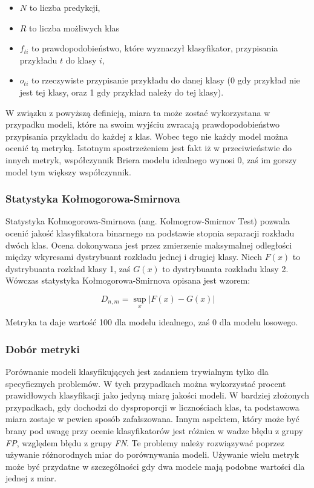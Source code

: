 \documentclass[a4paper, twoside, 11pt, openright]{article}
\begin{document}
\begin{itemize}
\item $N$ to liczba predykcji,
\item $R$  to liczba możliwych klas
\item $f_{ti}$ to prawdopodobieństwo, które wyznaczył klasyfikator, przypisania przykładu $t$ do klasy $i$,
\item $o_{ti}$ to rzeczywiste przypisanie przykładu do danej klasy (0 gdy przykład nie jest tej klasy, oraz 1 gdy przykład należy do tej klasy).
\end{itemize}

W związku z powyższą definicją, miara ta może zostać wykorzystana w przypadku modeli, które na swoim wyjściu zwracają prawdopodobieństwo przypisania przykładu do każdej z klas. Wobec tego nie każdy model można ocenić tą metryką. Istotnym spostrzeżeniem jest fakt iż w przeciwieństwie do innych metryk, współczynnik Briera modelu idealnego wynosi $0$, zaś im gorszy model tym większy współczynnik.


\subsubsection{Statystyka Kołmogorowa-Smirnova}

Statystyka Kołmogorowa-Smirnova (ang. Kolmogrow-Smirnov Test) pozwala ocenić jakość klasyfikatora binarnego na podstawie stopnia separacji rozkładu dwóch klas. Ocena dokonywana jest przez zmierzenie maksymalnej odległości między wkyresami dystrybuant rozkładu jednej i drugiej klasy. Niech $F(x)$ to dystrybuanta rozkład klasy 1, zaś $G(x)$ to dystrybuanta rozkładu klasy 2. Wówczas statystyka Kołmogorowa-Smirnova opisana jest wzorem:

$$D_{n,m}=\sup_x|F(x)-G(x)|$$

Metryka ta daje wartość 100 dla modelu idealnego, zaś 0 dla modelu losowego.

\subsubsection{Dobór metryki}

Porównanie modeli klasyfikujących jest zadaniem trywialnym tylko dla specyficznych problemów. W tych przypadkach można wykorzystać procent prawidłowych klasyfikacji jako jedyną miarę jakości modeli. W bardziej złożonych przypadkach, gdy dochodzi do dysproporcji w licznościach klas, ta podstawowa miara zostaje w pewien sposób zafałszowana. Innym aspektem, który może być brany pod uwagę przy ocenie klasyfikatorów jest różnica w wadze błędu z grupy \textit{FP}, względem błędu z grupy \textit{FN}. Te problemy należy rozwiązywać poprzez używanie różnorodnych miar do porównywania modeli. Używanie wielu metryk może być przydatne w szczególności gdy dwa modele mają podobne wartości dla jednej z miar.
\end{document}
